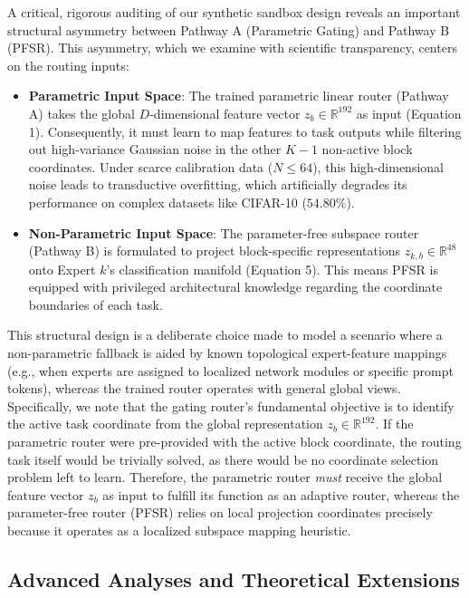 A critical, rigorous auditing of our synthetic sandbox design reveals an important structural asymmetry between Pathway A (Parametric Gating) and Pathway B (PFSR). This asymmetry, which we examine with scientific transparency, centers on the routing inputs:
\begin{itemize}
    \item \textbf{Parametric Input Space}: The trained parametric linear router (Pathway A) takes the global $D$-dimensional feature vector $z_b \in \mathbb{R}^{192}$ as input (Equation 1). Consequently, it must learn to map features to task outputs while filtering out high-variance Gaussian noise in the other $K-1$ non-active block coordinates. Under scarce calibration data ($N \le 64$), this high-dimensional noise leads to transductive overfitting, which artificially degrades its performance on complex datasets like CIFAR-10 ($54.80\%$).
    \item \textbf{Non-Parametric Input Space}: The parameter-free subspace router (Pathway B) is formulated to project block-specific representations $z_{k, b} \in \mathbb{R}^{48}$ onto Expert $k$'s classification manifold (Equation 5). This means PFSR is equipped with privileged architectural knowledge regarding the coordinate boundaries of each task.
\end{itemize}

This structural design is a deliberate choice made to model a scenario where a non-parametric fallback is aided by known topological expert-feature mappings (e.g., when experts are assigned to localized network modules or specific prompt tokens), whereas the trained router operates with general global views. Specifically, we note that the gating router's fundamental objective is to identify the active task coordinate from the global representation $z_b \in \mathbb{R}^{192}$. If the parametric router were pre-provided with the active block coordinate, the routing task itself would be trivially solved, as there would be no coordinate selection problem left to learn. Therefore, the parametric router \emph{must} receive the global feature vector $z_b$ as input to fulfill its function as an adaptive router, whereas the parameter-free router (PFSR) relies on local projection coordinates precisely because it operates as a localized subspace mapping heuristic. 

\subsection{Advanced Analyses and Theoretical Extensions}
\label{sec:advanced_analyses}

